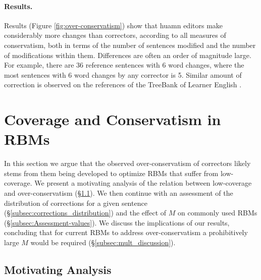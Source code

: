 \documentclass[letterpaper, 11pt]{article}
\begin{document}
\paragraph{Results.}
Results (Figure \ref{fig:over-conservatism}) show that huamn editors make considerably more changes than correctors, according to all measures of conservatism, both in terms of the number of sentences modified and the number of modifications within them. Differences are often an order of magnitude large.
For example, there are 36 reference sentences with 6 word changes, where the most sentences with 6 word changes by any corrector is 5.
Similar amount of correction is observed on the references of the TreeBank of Learner English \cite{yannakoudakis2011new}.
%
%
\section{Coverage and Conservatism in RBMs}\label{sec:increase-reference}
%
In this section we argue that the observed over-conservatism of correctors likely stems
from them being developed to optimize RBMs that suffer from low-coverage.
We present a motivating analysis of the relation between low-coverage and over-conservatism (\S \ref{subsec:motivating_analysis}). We then continue with an assessment of the distribution of corrections for a given sentence (\S \ref{subsec:corrections_distribution})
and the effect of $M$ on commonly used RBMs (\S \ref{subsec:Assessment-values}).
We discuss the implications of our results, concluding that for current RBMs  
to address over-conservatism a prohibitively large $M$ would be required (\S \ref{subsec:mult_discussion}).

\subsection{Motivating Analysis}\label{subsec:motivating_analysis}
\end{document}
